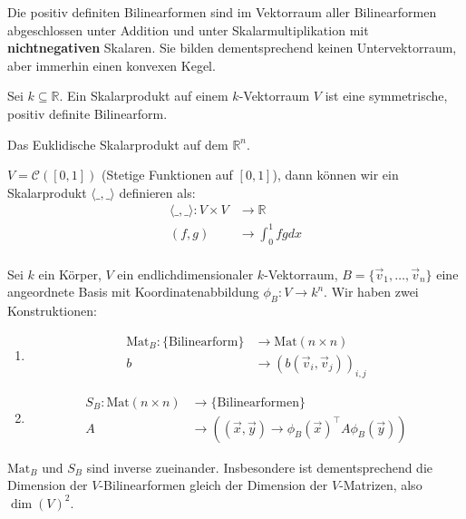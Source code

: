 \documentclass{report}
\newcommand{\tbf}[1]{\textbf{#1}}
\newcommand{\bR}{\mathbb{R}}
\newcommand{\vv}{\vec{v}}
\newcommand{\vx}{\vec{x}}
\newcommand{\vy}{\vec{y}}
\newcommand{\scalar}[2]{\langle #1, #2 \rangle}
\begin{document}
\begin{beobachtung}
 Die positiv definiten Bilinearformen sind im Vektorraum aller Bilinearformen abgeschlossen unter Addition und unter Skalarmultiplikation mit \tbf{nichtnegativen} Skalaren. Sie bilden dementsprechend keinen Untervektorraum, aber immerhin einen konvexen Kegel.
\end{beobachtung}
\begin{definition}
 Sei $k \subseteq \bR$. Ein Skalarprodukt auf einem $k$-Vektorraum $V$ ist eine symmetrische, positiv definite Bilinearform.
\end{definition}
\begin{beispiel}
 Das Euklidische Skalarprodukt auf dem $\bR^n$.
\end{beispiel}
\begin{beispiel}
 $V = \mathcal{C}([0,1])$ (Stetige Funktionen auf $[0,1]$), dann können wir ein Skalarprodukt $\scalar{\_}{\_}$ definieren als:
 \begin{align*}
  \scalar{\_}{\_} : V \times V &\to \bR\\
  (f,g) &\to \int_{0}^1 f g dx\\
 \end{align*}
\end{beispiel}
\begin{beobachtung}
 Sei $k$ ein Körper, $V$ ein endlichdimensionaler $k$-Vektorraum, $B = \{\vv_1, \hdots, \vv_n\}$ eine angeordnete Basis mit Koordinatenabbildung $\phi_B : V \to k^n$. Wir haben zwei Konstruktionen:
 \begin{enumerate}
  \item \begin{align*}
         \text{Mat}_B: \{\text{Bilinearform}\} &\to \text{Mat}(n \times n)\\
         b &\to (b(\vv_i, \vv_j))_{i,j}
        \end{align*}
  \item \begin{align*}
         S_B : \text{Mat}(n \times n) &\to \{\text{Bilinearformen}\}\\
         A &\to ((\vx,\vy) \to \phi_B(\vx)^\top A \phi_B(\vy))
        \end{align*}
 \end{enumerate}
\end{beobachtung}
\begin{proposition}
 $\text{Mat}_B$ und $S_B$ sind inverse zueinander. Insbesondere ist dementsprechend die Dimension der $V$-Bilinearformen gleich der Dimension der $V$-Matrizen, also $\dim(V)^2$. 
\end{proposition}
\end{document}
